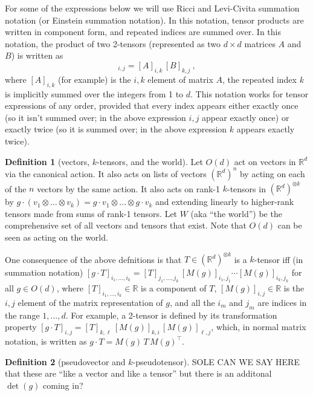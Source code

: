 \documentclass{article}
\theoremstyle{definition}
\newtheorem{definition}{Definition}
\begin{document}
For some of the expressions below we will use Ricci and Levi-Civita summation notation (or Einstein summation notation).
In this notation, tensor products are written in component form, and repeated indices are summed over.
In this notation, the product of two 2-tensors (represented as two $d\times d$ matrices $A$ and $B$) is written as
\begin{equation}
    [A\, B]_{i,j} = [A]_{i,k}\,[B]_{k,j} ~,
\end{equation}
where $[A]_{i,k}$ (for example) is the $i,k$ element of matrix $A$, the repeated index $k$ is implicitly summed over the integers from 1 to $d$.
This notation works for tensor expressions of any order, provided that every index appears either exactly once (so it isn't summed over; in the above expression $i, j$ appear exactly once) or exactly twice (so it is summed over; in the above expression $k$ appears exactly twice). 

\begin{definition}[vectors, $k$-tensors, and the world]
Let $O(d)$ act on vectors in $\mathbb R^d$ via the canonical action.
It also acts on lists of vectors $(\mathbb R^d)^n$ by acting on each of the $n$ vectors by the same action.
It also acts on rank-1 $k$-tensors in $(\mathbb R^d)^{\otimes k}$ by $g\cdot (v_{1}\otimes\ldots \otimes v_k) = g\cdot v_1\otimes \ldots \otimes g\cdot v_k$ and extending linearly to higher-rank tensors made from sums of rank-1 tensors.
Let $W$ (aka ``the world'') be the comprehensive set of all vectors and tensors that exist.
Note that $O(d)$ can be seen as acting on the world.
\end{definition}

One consequence of the above defnitions is that 
$T\in (\mathbb R^d)^{\otimes k}$ is a $k$-tensor iff (in summation notation)
$[g\cdot T]_{i_1,\ldots, i_k} = [T]_{j_1,\ldots,j_k}\,[M(g)]_{i_1,j_1}\cdots[M(g)]_{i_k,j_k}$ for all $g\in O(d)$, where $[T]_{i_1, \ldots ,i_k} \in \mathbb R$ is a component of $T$, $[M(g)]_{i,j}\in\mathbb R$ is the $i,j$ element of the matrix representation of $g$, and all the $i_m$ and $j_m$ are indices in the range $1,\ldots,d$.
For example, a 2-tensor is defined by its transformation property
$[g\cdot T]_{i,j} = [T]_{k,\ell}\,[M(g)]_{k,i}\,[M(g)]_{\ell,j}$,
which, in normal matrix notation, is written as
$g\cdot T = M(g)\,T\,M(g)^\top$.

\begin{definition}[pseudovector and $k$-pseudotensor]
SOLE CAN WE SAY HERE that these are ``like a vector and like a tensor'' but there is an additonal $\det(g)$ coming in?
\end{definition}
\end{document}
